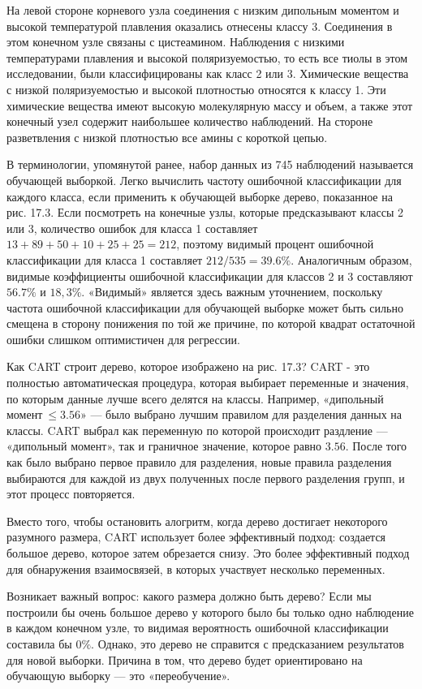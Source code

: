 На левой стороне корневого узла соединения с низким дипольным моментом и высокой температурой плавления оказались отнесены классу 3. Соединения в этом конечном узле связаны с цистеамином. Наблюдения с низкими температурами плавления и высокой поляризуемостью, то есть все тиолы в этом исследовании, были классифицированы как класс 2 или 3. Химические вещества с низкой поляризуемостью и высокой плотностью относятся к классу 1. Эти химические вещества имеют высокую молекулярную массу и объем, а также этот конечный узел содержит наибольшее количество наблюдений. На стороне разветвления с низкой плотностью все амины с короткой цепью.

В терминологии, упомянутой ранее, набор данных из 745 наблюдений называется обучающей выборкой. Легко вычислить частоту ошибочной классификации для каждого класса, если применить к обучающей выборке дерево, показанное на рис. 17.3. Если посмотреть на конечные узлы, которые предсказывают классы 2 или 3, количество ошибок для класса 1 составляет $13 + 89 + 50 + 10 + 25 + 25 = 212$, поэтому видимый процент ошибочной классификации для класса 1 составляет $212/535 = 39.6 \%$. Аналогичным образом, видимые коэффициенты ошибочной классификации для классов 2 и 3 составляют $56.7 \%$ и $18,3\%$. «Видимый» является здесь важным уточнением, поскольку частота ошибочной классификации для обучающей выборке может быть сильно смещена в сторону понижения по той же причине, по которой квадрат остаточной ошибки слишком оптимистичен для регрессии.

Как CART строит дерево, которое изображено на рис. 17.3? CART - это полностью автоматическая процедура, которая выбирает переменные и значения, по которым  данные лучше всего делятся на классы. Например, «дипольный момент$ \ \leq 3.56$» --- было выбрано лучшим правилом для разделения данных на классы. CART выбрал как переменную по которой происходит раздление --- «дипольный момент», так и граничное значение, которое равно $3.56$. После того как было выбрано первое правило для разделения, новые правила разделения выбираются для каждой из двух полученных после первого разделения групп, и этот процесс повторяется. 

Вместо того, чтобы остановить алогритм, когда дерево достигает некоторого разумного размера, CART использует более эффективный подход: создается большое дерево, которое затем обрезается снизу. Это более эффективный подход для обнаружения взаимосвязей, в которых участвует несколько переменных.

Возникает важный вопрос: какого размера должно быть дерево? Если мы построили бы очень большое дерево у которого было бы только одно наблюдение в каждом конечном узле, то видимая вероятность ошибочной классификации составила бы $0 \%$. Однако, это дерево не справится с предсказанием результатов для новой выборки. Причина в том, что дерево будет ориентировано на обучающую выборку --- это «переобучение».

